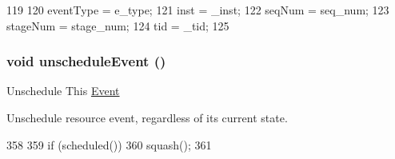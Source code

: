 \begin{DoxyCode}
119         {
120             eventType = e_type;
121             inst = _inst;
122             seqNum = seq_num;
123             stageNum = stage_num;
124             tid = _tid;
125         }
\end{DoxyCode}
\hypertarget{classResourcePool_1_1ResPoolEvent_a8521a64adc8d310754330bc7dfe48831}{
\subsubsection[{unscheduleEvent}]{\setlength{\rightskip}{0pt plus 5cm}void unscheduleEvent ()}}
\label{classResourcePool_1_1ResPoolEvent_a8521a64adc8d310754330bc7dfe48831}
Unschedule This \hyperlink{classEvent}{Event}

Unschedule resource event, regardless of its current state. 


\begin{DoxyCode}
358 {
359     if (scheduled())
360         squash();
361 }
\end{DoxyCode}


